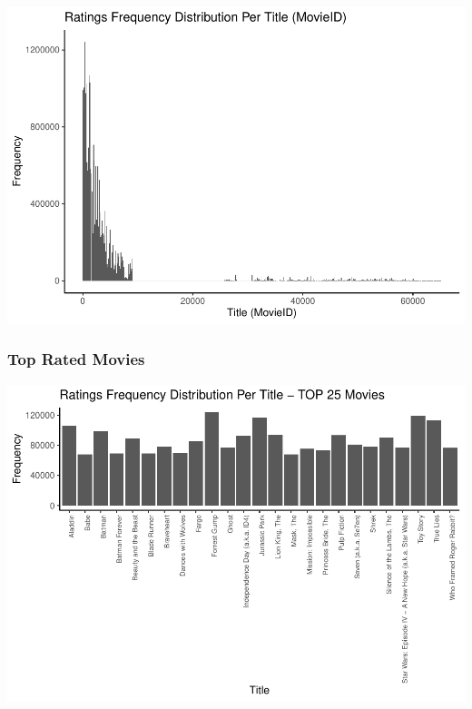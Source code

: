 \documentclass[
]{article}
\begin{document}
\begin{center}\includegraphics{MovieLens-Project-Report_files/figure-latex/unnamed-chunk-19-1} \end{center}

\hypertarget{top-rated-movies}{%
\subsubsection{Top Rated Movies}\label{top-rated-movies}}

\begin{center}\includegraphics{MovieLens-Project-Report_files/figure-latex/unnamed-chunk-20-1} \end{center}
\end{document}

